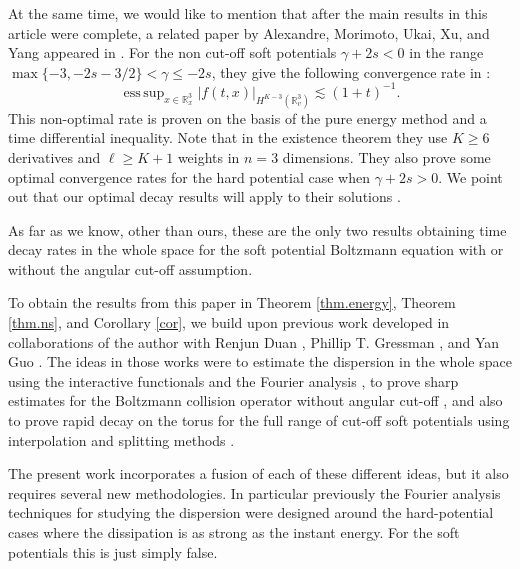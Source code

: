 \documentclass{amsart}
\numberwithin{equation}{section}
\begin{document}
At the same time, we would like to mention that after the main results in this article were complete, a related paper by Alexandre, Morimoto, Ukai, Xu, and Yang appeared in \cite{MR2847536}.  For the non cut-off soft potentials $\gamma + 2s <0$ in the range $\max\{-3, -2s -3/2\}< \gamma \le -2s$, they give the following convergence rate in \cite{MR2847536}:
$$
\operatorname{ess\,sup}_{x\in {\mathbb{R}}^3_x} {|} {f}(t,x) {|}_{H^{{K}-3}({\mathbb{R}}^3_{v})}  \lesssim  (1+t)^{-1}.
$$
This non-optimal rate is proven on the basis of the pure energy method and a time differential inequality.
Note that in the existence theorem they use ${K} \ge 6$ derivatives and ${\ell} \ge {K} +1$ weights in ${n} = 3$ dimensions.  
They also prove some optimal convergence rates for the hard potential case when $\gamma + 2s > 0$. We point out that 
our optimal decay results will apply to their solutions  \cite{MR2847536}.

As far as we know, other than ours, these are the only two results obtaining time decay rates in the whole space for the soft potential Boltzmann equation with or without the angular cut-off assumption.

To obtain the results from this paper in Theorem \ref{thm.energy}, Theorem \ref{thm.ns}, and Corollary \ref{cor}, 
we build upon previous work developed in  collaborations of the author with Renjun Duan \cite{arXiv:0912.1742,2010arXiv1006.3605D}, Phillip T. Gressman \cite{gsNonCutA,gsNonCut0,gsNonCutEst}, and Yan Guo \cite{MR2209761,MR2366140}.  The ideas in those works were to estimate the dispersion in the whole space using the interactive functionals and the Fourier analysis \cite{arXiv:0912.1742,2010arXiv1006.3605D}, to prove sharp estimates for the Boltzmann collision operator without angular cut-off \cite{gsNonCutA,gsNonCut0,gsNonCutEst}, and also to prove rapid decay on the torus for the full range of cut-off soft potentials using interpolation 
\cite{MR2209761}
and splitting methods \cite{MR2366140}. 
 
 The present work incorporates a fusion of each of these different ideas, but it also requires several new methodologies.  
In particular previously the Fourier analysis techniques for studying the dispersion were designed around the hard-potential cases where the dissipation is as strong as the instant energy.  For the soft potentials this is just simply false.
\end{document}

